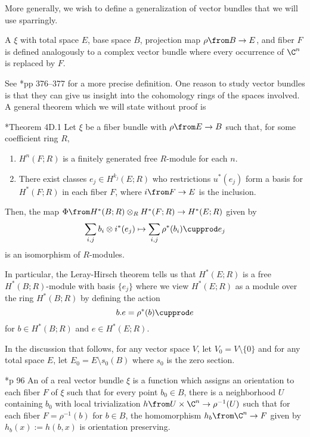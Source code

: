 \documentclass[11pt,leqno,oneside]{amsbook}
\numberwithin{thm}{section}
\begin{document}
More generally, we wish to define a generalization of vector bundles
that we will use sparringly.
\begin{defn}
   A  \(\xi\) with total space \(E\), base space
   \(B\), projection map \(\rho \from B \to E\), and fiber \(F\) is
   defined analogously to a complex vector bundle where every
   occurrence of \(\C^n\) is replaced by \(F\).
\end{defn}
See \cite{hatcher}*{pp 376--377} for a more precise definition. 
One reason to study vector bundles is that they can give us insight
into the cohomology rings of the spaces involved. A general theorem
which we will state without proof is
\begin{thm}\label{leray-hirsch}
  \cite{hatcher}*{Theorem 4D.1} Let \(\xi\) be a fiber bundle with
  \(\rho \from E \to B\) such that, for some coefficient ring \(R\),
  \begin{enumerate}
  \item \(H^n(F;R)\) is a finitely generated free \(R\)-module for
    each \(n\).
  \item There exist classes \(e_j \in H^{k_j}(E;R)\) who restrictions
    \(u^*(e_j)\) form a basis for \(H^*(F;R)\) in each fiber \(F\),
    where \(i \from F \to E\) is the inclusion.
  \end{enumerate}
  Then, the map \(\Phi \from H^*(B;R) \otimes_R H^*(F;R) \to
  H^*(E;R)\) given by \[
    \sum_{i,j} b_i \otimes i^*(e_j) \mapsto \sum_{i,j} \rho^*(b_i)
    \cupprod e_j
  \]
  is an isomorphism of \(R\)-modules.
\end{thm}
In particular, the Leray-Hirsch theorem tells us that \(H^*(E;R)\) is
a free \(H^*(B;R)\)-module with basis \(\{e_j\}\) where we view
\(H^*(E;R)\) as a module over the ring \(H^*(B;R)\) by defining the
action \[
  b.e = \rho^*(b) \cupprod e
\]
for \(b \in H^*(B;R)\) and \(e \in H^*(E;R)\).
\begin{defn}
  In the discussion that follows, for any vector space \(V\), let
  \(V_0 = V \setminus \{0\}\) and for any total space \(E\), let \(E_0
  = E \setminus s_0(B)\) where \(s_0\) is the zero section.
\end{defn}
\begin{defn}
  \cite{milnor-stasheff}*{p 96} An  of a real vector
  bundle 
  \(\xi\) is a function which assigns an orientation to each fiber
  \(F\) of \(\xi\) such that for every point \(b_0 \in B\), there is a
  neighborhood \(U\) containing \(b_0\) with local
  trivialization \(h \from U \times \C^n \to \rho^{-1}(U)\) such that
  for each fiber \(F = \rho^{-1}(b)\) for \(b \in B\), the
  homomorphism \(h_b \from \C^n \to F\) given by \(h_b(x) := h(b,x)\)
  is orientation preserving. 
\end{defn}
\end{document}
